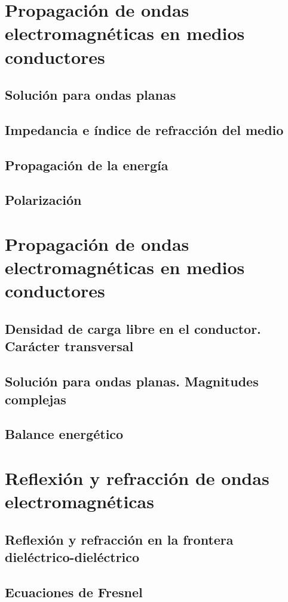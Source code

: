 \documentclass[a4paper]{book}
\numberwithin{figure}{chapter}
\numberwithin{equation}{chapter}
\begin{document}
\chapter{Propagación de ondas electromagnéticas en medios conductores}
\section{Solución para ondas planas}
\section{Impedancia e índice de refracción del medio}
\section{Propagación de la energía}
\section{Polarización}

\chapter{Propagación de ondas electromagnéticas en medios conductores}
\section{Densidad de carga libre en el conductor. Carácter transversal}
\section{Solución para ondas planas. Magnitudes complejas}
\section{Balance energético}

\chapter{Reflexión y refracción de ondas electromagnéticas}
\section[Reflexión y refracción en la frontera dieléctrico-dieléctrico]{Reflexión y refracción en la frontera\\ dieléctrico-dieléctrico}
\section{Ecuaciones de Fresnel}
\end{document}
